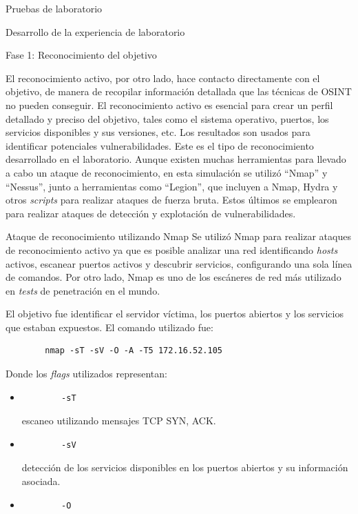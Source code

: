 \begin{section}{Pruebas de laboratorio}
\begin{subsection}{Desarrollo de la experiencia de laboratorio}
\begin{subsubsection}{Fase 1: Reconocimiento del objetivo}
\begin{figure}[H]
    \label{fig:osint}
    \end{figure}
    \FloatBarrier
    El reconocimiento activo, por otro lado, hace contacto directamente con el objetivo, de manera de recopilar información detallada que las técnicas de OSINT no pueden conseguir. El reconocimiento activo es esencial para crear un perfil detallado y preciso del objetivo, tales como el sistema operativo, puertos, los servicios disponibles y sus versiones, etc. Los resultados son usados para identificar potenciales vulnerabilidades. Este es el tipo de reconocimiento desarrollado en el laboratorio. Aunque existen muchas herramientas para llevado a cabo un ataque de reconocimiento, en esta simulación se utilizó “Nmap” y “Nessus”, junto a herramientas como “Legion”, que incluyen a Nmap, Hydra y otros \textit{scripts} para realizar ataques de fuerza bruta. Estos últimos se emplearon para realizar ataques de detección y explotación de vulnerabilidades. 
    \end{subsubsection}
    \begin{subsubsection}{Ataque de reconocimiento utilizando Nmap}
    Se utilizó Nmap \cite{nmap} para realizar ataques de reconocimiento activo ya que es posible analizar una red identificando \textit{hosts} activos, escanear puertos activos y descubrir servicios, configurando una sola línea de comandos. Por otro lado, Nmap es uno de los escáneres de red más utilizado en \textit{tests} de penetración en el mundo.\par
    El objetivo fue identificar el servidor víctima, los puertos abiertos y los servicios que estaban expuestos.
    El comando utilizado fue: 
    \begin{verbatim}
        nmap -sT -sV -O -A -T5 172.16.52.105
    \end{verbatim}
    Donde los \textit{flags} utilizados representan:
    \begin{itemize}
        \item \begin{verbatim}
        -sT    
        \end{verbatim}
         escaneo utilizando mensajes TCP SYN, ACK.
        \item \begin{verbatim}
        -sV
        \end{verbatim}
         detección de los servicios disponibles en los puertos abiertos y su información asociada.
        \item \begin{verbatim}
        -O
        \end{verbatim} 

\end{itemize}
\end{subsubsection}
\end{subsection}
\end{section}
